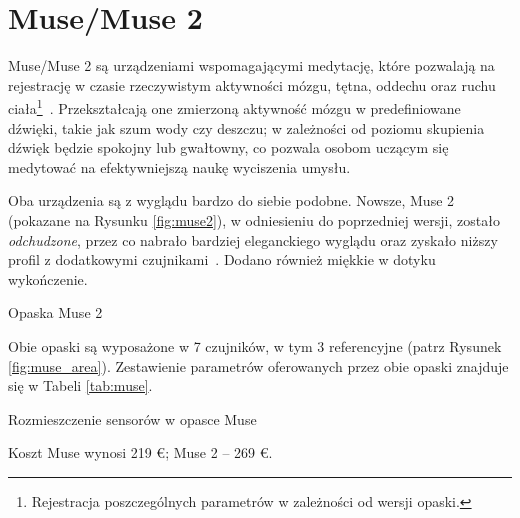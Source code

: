 \documentclass[skorowidz,skroty]{dyplomWEZUT}
\begin{document}
\section{Muse/Muse 2}
Muse/Muse 2 są urządzeniami wspomagającymi medytację, które pozwalają na rejestrację w czasie rzeczywistym aktywności mózgu, tętna, oddechu oraz ruchu ciała\footnote{Rejestracja poszczególnych parametrów w zależności od wersji opaski.}~\cite{muse2}. Przekształcają one zmierzoną aktywność mózgu w predefiniowane dźwięki, takie jak szum wody czy deszczu; w zależności od poziomu skupienia dźwięk będzie spokojny lub gwałtowny, co pozwala osobom uczącym się medytować na efektywniejszą naukę wyciszenia umysłu.

Oba urządzenia są z wyglądu bardzo do siebie podobne. Nowsze, Muse 2 (pokazane na Rysunku \vref{fig:muse2}), w odniesieniu do poprzedniej wersji, zostało \textit{odchudzone}, przez co nabrało bardziej eleganckiego wyglądu oraz zyskało niższy profil z dodatkowymi czujnikami~\cite{muse_comparison_article}. Dodano również miękkie w dotyku wykończenie.

{Opaska Muse 2\label{fig:muse2}}
{\cite{muse2}}
  
Obie opaski są wyposażone w 7 czujników, w tym 3 referencyjne (patrz Rysunek \vref{fig:muse_area}). Zestawienie parametrów oferowanych przez obie opaski znajduje się w Tabeli \vref{tab:muse}.

{Rozmieszczenie sensorów w opasce Muse\label{fig:muse_area}}
{\cite{muse_specification}}

Koszt Muse wynosi 219 €; Muse 2 -- 269 €.
\end{document}
